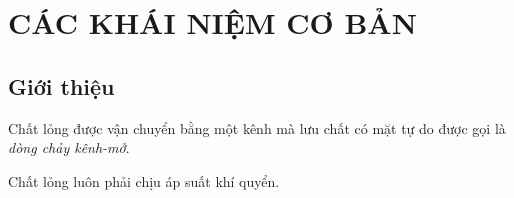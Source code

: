 \documentclass[DONG_CHAY_KENH.tex]{subfiles}
\begin{document}
\chapter{CÁC KHÁI NIỆM CƠ BẢN}

\section{Giới thiệu}

Chất lỏng được vận chuyển bằng một kênh mà lưu chất có mặt tự do được gọi là \emph{dòng chảy kênh-mở}.

Chất lỏng luôn phải chịu áp suất khí quyển. 
\end{document}
